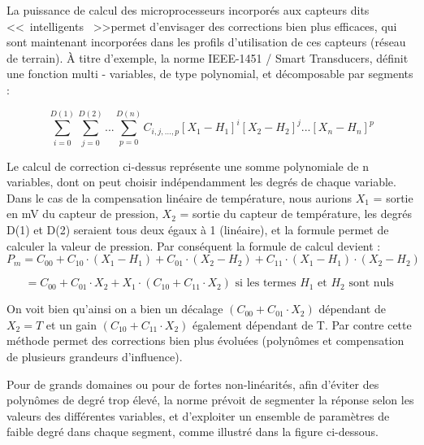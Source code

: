 La puissance de calcul des microprocesseurs incorporés aux capteurs dits \textless\textless\ intelligents \ \textgreater\textgreater permet d'envisager des corrections bien plus efficaces, qui sont maintenant incorporées dans les profils d'utilisation de ces capteurs (réseau de terrain).
À titre d'exemple, la norme IEEE-1451 / Smart Transducers, définit une fonction multi - variables, de type polynomial, et décomposable par segments :

\begin{equation}
    \displaystyle\sum_{i=0}^{D(1)}
    \displaystyle\sum_{j=0}^{D(2)} \text{...}
    \displaystyle\sum_{p=0}^{D(n)} C_{i,j,...,p} [X_1-H_1]^i[X_2-H_2]^j \text{...} [X_n-H_n]^p
\end{equation}

Le calcul de correction ci-dessus représente une somme polynomiale de n variables, dont on peut choisir indépendamment les degrés de chaque variable. Dans le cas de la compensation linéaire de température, nous aurions $X_1$ = sortie en mV du capteur de pression, $X_2$ = sortie du capteur de température, les degrés D(1) et D(2) seraient tous deux égaux à 1 (linéaire), et la formule permet de calculer la valeur de pression. Par conséquent la formule de calcul devient :
\begin{equation}
    P_m =C_{00} + C_{10} \cdot (X_1-H_1)+C_{01} \cdot (X_2-H_2) + C_{11}\cdot(X_1-H_1) \cdot (X_2-H_2)
\end{equation}

\begin{equation*}
    = C_{00} + C_{01} \cdot X_2 + X_1 \cdot (C_{10} + C_{11} \cdot X_2)  \text{ si les termes $H_1$ et $H_2$ sont nuls }
\end{equation*}

On voit bien qu'ainsi on a bien un décalage $(C_{00} + C_{01} \cdot X_2)$ dépendant de $X_2=T$ et un gain $(C_{10} + C_{11} \cdot X_2)$ également dépendant de T. Par contre cette méthode permet des corrections bien plus évoluées (polynômes et compensation de plusieurs grandeurs d'influence).

Pour de grands domaines ou pour de fortes non-linéarités, afin d'éviter des polynômes de degré trop élevé, la norme prévoit de segmenter la réponse selon les valeurs des différentes variables, et d'exploiter un ensemble de paramètres de faible degré dans chaque segment, comme illustré dans la figure ci-dessous.

